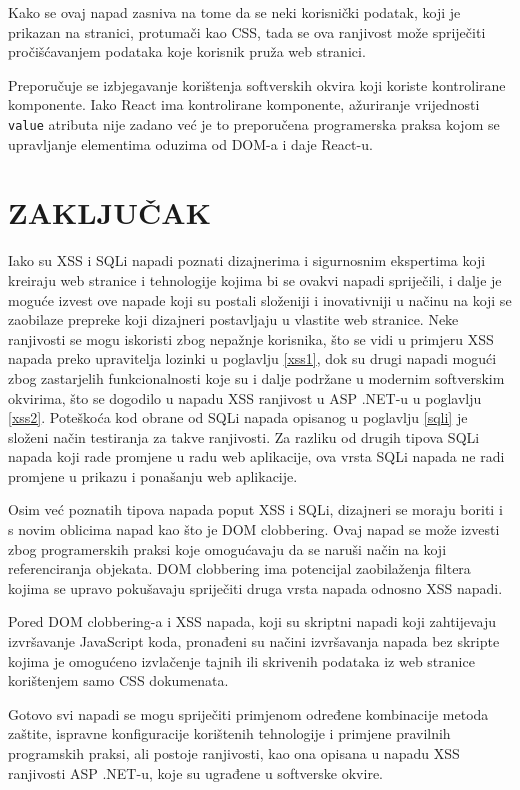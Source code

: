 \documentclass[12pt, oneside, onecolumn]{book}
\begin{document}
{Kako se ovaj napad zasniva na tome da se neki korisnički podatak, koji je prikazan na stranici, protumači kao CSS, tada se ova ranjivost može spriječiti pročišćavanjem podataka koje korisnik pruža web stranici.

Preporučuje se izbjegavanje korištenja softverskih okvira koji koriste kontrolirane komponente. Iako React ima kontrolirane komponente, ažuriranje vrijednosti \texttt{value} atributa nije zadano već je to preporučena programerska praksa kojom se upravljanje elementima oduzima od DOM-a i daje React-u.

\chapter{ZAKLJUČAK}
Iako su XSS i SQLi napadi poznati dizajnerima i sigurnosnim ekspertima koji kreiraju web stranice i tehnologije kojima bi se ovakvi napadi spriječili, i dalje je moguće izvest ove napade koji su postali složeniji i inovativniji u načinu na koji se zaobilaze prepreke koji dizajneri postavljaju u vlastite web stranice. Neke ranjivosti se mogu iskoristi zbog nepažnje korisnika, što se vidi u primjeru XSS napada preko upravitelja lozinki u poglavlju \ref{xss1}, dok su drugi napadi mogući zbog zastarjelih funkcionalnosti koje su i dalje podržane u modernim softverskim okvirima, što se dogodilo u napadu XSS ranjivost u ASP .NET-u u poglavlju \ref{xss2}. Poteškoća kod obrane od SQLi napada opisanog u poglavlju \ref{sqli} je složeni način testiranja za takve ranjivosti. Za razliku od drugih tipova SQLi napada koji rade promjene u radu web aplikacije, ova vrsta SQLi napada ne radi promjene u prikazu i ponašanju web aplikacije.

Osim već poznatih tipova napada poput XSS i SQLi, dizajneri se moraju boriti i s novim oblicima napad kao što je DOM clobbering. Ovaj napad se može izvesti zbog programerskih praksi koje omogućavaju da se naruši način na koji referenciranja objekata. DOM clobbering ima potencijal zaobilaženja filtera kojima se upravo pokušavaju spriječiti druga vrsta napada odnosno XSS napadi.

Pored DOM clobbering-a i XSS napada, koji su skriptni napadi koji zahtijevaju izvršavanje JavaScript koda, pronađeni su načini izvršavanja napada bez skripte kojima je omogućeno izvlačenje tajnih ili skrivenih podataka iz web stranice korištenjem samo CSS dokumenata.

Gotovo svi napadi se mogu spriječiti primjenom određene kombinacije metoda zaštite, ispravne konfiguracije korištenih tehnologije i primjene pravilnih programskih praksi, ali postoje ranjivosti, kao ona opisana u napadu XSS ranjivosti ASP .NET-u, koje su ugrađene u softverske okvire.

}
\end{document}
